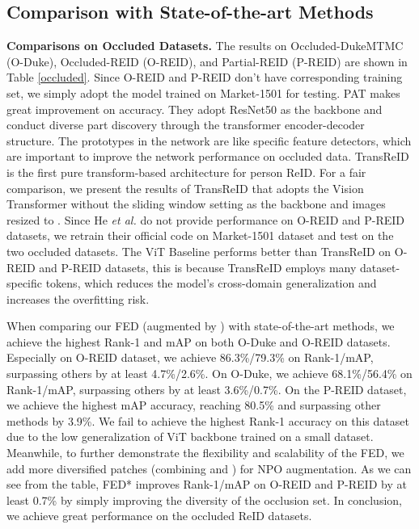 \documentclass[10pt,twocolumn,letterpaper]{article}
\begin{document}
\subsection{Comparison with State-of-the-art Methods}
\textbf{Comparisons on Occluded Datasets.}
The results on Occluded-DukeMTMC (O-Duke), Occluded-REID (O-REID), and Partial-REID (P-REID) are shown in Table \ref{occluded}. Since O-REID and P-REID don't have  corresponding training set, we simply adopt the model trained on Market-1501 for testing.
PAT \cite{li2021diverse} makes great improvement on accuracy. They adopt ResNet50 \cite{he2016deep} as the backbone and conduct diverse part discovery through the transformer encoder-decoder structure. The prototypes in the network are like specific feature detectors, which are important to improve the network performance on occluded data. 
TransReID \cite{he2021transreid} is the first pure transform-based architecture for person ReID. For a fair comparison, we present the results of TransReID that adopts the Vision Transformer \cite{dosovitskiy2020image} without the sliding window setting as the backbone and images resized to . Since He \emph{et al.} \cite{he2021transreid} do not provide performance on O-REID and P-REID datasets, we retrain their official code on Market-1501 dataset and test on the two occluded datasets. The ViT Baseline performs better than TransReID on O-REID and P-REID datasets, this is because TransReID employs many dataset-specific tokens, which reduces the model's cross-domain generalization and increases the overfitting risk.


When comparing our FED (augmented by ) with state-of-the-art methods, we achieve the highest Rank-1 and mAP on both O-Duke and O-REID datasets. Especially on O-REID dataset, we achieve 86.3\%/79.3\% on Rank-1/mAP, surpassing others by at least 4.7\%/2.6\%. On O-Duke, we achieve 68.1\%/56.4\% on Rank-1/mAP, surpassing others by at least 3.6\%/0.7\%. 
On the P-REID dataset, we achieve the highest mAP accuracy, reaching 80.5\% and surpassing other methods by 3.9\%. We fail to achieve the highest Rank-1 accuracy on this dataset due to the low generalization of ViT backbone trained on a small dataset. 
Meanwhile, to further demonstrate the flexibility and scalability of the FED, we add more diversified patches (combining  and ) for NPO augmentation. As we can see from the table, FED* improves Rank-1/mAP on O-REID and P-REID by at least 0.7\% by simply improving the diversity of the occlusion set. In conclusion, we achieve great performance on the occluded ReID datasets. 
\end{document}
